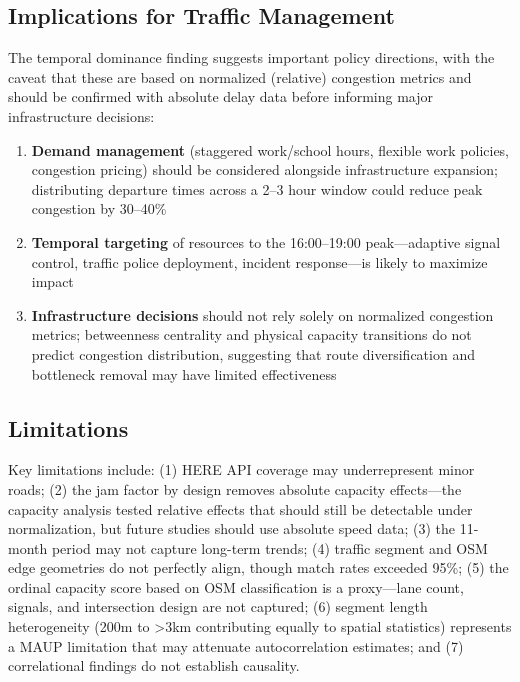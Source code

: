 \documentclass[12pt,a4paper]{article}
\begin{document}
\subsection{Implications for Traffic Management}

The temporal dominance finding suggests important policy directions, with the caveat that these are based on normalized (relative) congestion metrics and should be confirmed with absolute delay data before informing major infrastructure decisions:

\begin{enumerate}
\item \textbf{Demand management} (staggered work/school hours, flexible work policies, congestion pricing) should be considered alongside infrastructure expansion; distributing departure times across a 2--3 hour window could reduce peak congestion by 30--40\%
\item \textbf{Temporal targeting} of resources to the 16:00--19:00 peak---adaptive signal control, traffic police deployment, incident response---is likely to maximize impact
\item \textbf{Infrastructure decisions} should not rely solely on normalized congestion metrics; betweenness centrality and physical capacity transitions do not predict congestion distribution, suggesting that route diversification and bottleneck removal may have limited effectiveness
\end{enumerate}

\subsection{Limitations}

Key limitations include: (1) HERE API coverage may underrepresent minor roads; (2) the jam factor by design removes absolute capacity effects---the capacity analysis tested relative effects that should still be detectable under normalization, but future studies should use absolute speed data; (3) the 11-month period may not capture long-term trends; (4) traffic segment and OSM edge geometries do not perfectly align, though match rates exceeded 95\%; (5) the ordinal capacity score based on OSM classification is a proxy---lane count, signals, and intersection design are not captured; (6) segment length heterogeneity (200m to >3km contributing equally to spatial statistics) represents a MAUP limitation that may attenuate autocorrelation estimates; and (7) correlational findings do not establish causality.
\end{document}
